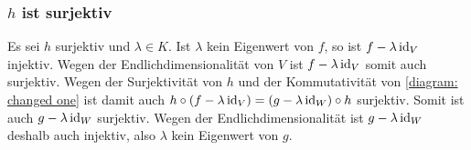 \subsubsection{\texorpdfstring{$h$}{h} ist surjektiv}

Es sei $h$ surjektiv und $\lambda \in K$.
Ist $\lambda$ kein Eigenwert von $f$, so ist $f - \lambda \operatorname{id}_V$ injektiv.
Wegen der Endlichdimensionalität von $V$ ist $f - \lambda \operatorname{id}_V$ somit auch surjektiv.
Wegen der Surjektivität von $h$ und der Kommutativität von \eqref{diagram: changed one} ist damit auch $h \circ (f - \lambda \operatorname{id}_V) = (g - \lambda \operatorname{id}_W) \circ h$ surjektiv.
Somit ist auch $g - \lambda \operatorname{id}_W$ surjektiv.
Wegen der Endlichdimensionalität ist $g - \lambda \operatorname{id}_W$ deshalb auch injektiv, also $\lambda$ kein Eigenwert von $g$.

